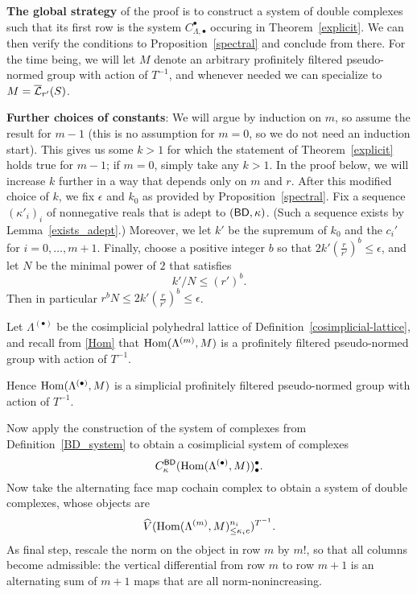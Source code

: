 \textbf{The global strategy}
of the proof is to construct a system of double complexes
such that its first row is the system $C_{\Lambda, \bullet}^\bullet$
occuring in Theorem~\ref{explicit}.
We can then verify the conditions to Proposition~\ref{spectral}
and conclude from there.
For the time being, we will let $M$ denote
an arbitrary profinitely filtered pseudo-normed group with action of $T^{-1}$,
and whenever needed we can specialize to $M = \overline{\mathcal L}_{r'}(S)$.

\textbf{Further choices of constants}:
We will argue by induction on $m$, so assume the result for $m-1$
(this is no assumption for $m=0$, so we do not need an induction start).
This gives us some $k>1$ for which the statement of Theorem~\ref{explicit} holds true for $m-1$;
if $m=0$, simply take any $k>1$.
In the proof below, we will increase $k$ further in a way that depends only on $m$ and $r$.
After this modified choice of $k$, we fix $\epsilon$ and $k_0$ as provided by Proposition~\ref{spectral}.
Fix a sequence $(\kappa'_i)_i$ of nonnegative reals that is adept to $(\mathsf{BD}, \kappa)$.
(Such a sequence exists by Lemma~\ref{exists_adept}.)
Moreover, we let $k'$ be the supremum of $k_0$ and the $c_i'$ for $i=0,\ldots,m+1$.
Finally, choose a positive integer $b$ so that $2k'(\tfrac r{r'})^b\leq \epsilon$,
and let $N$ be the minimal power of $2$ that satisfies
\[
  k'/N\leq (r')^b.
\]
Then in particular $r^bN\leq 2k'(\tfrac{r}{r'})^b\leq \epsilon$.

\begin{definition}
  \label{double_complex}
  \leanok
  Let $\Lambda^{(\bullet)}$ be the cosimplicial polyhedral lattice of
  Definition~\ref{cosimplicial-lattice},
  and recall from \ref{Hom} that $\operatorname{Hom}(\Lambda^{(m)}, M)$ is a
  profinitely filtered pseudo-normed group with action of $T^{-1}$.

  Hence $\operatorname{Hom}(\Lambda^{(\bullet)}, M)$ is a simplicial
  profinitely filtered pseudo-normed group with action of $T^{-1}$.

  Now apply the construction of the system of complexes from
  Definition~\ref{BD_system} to obtain a cosimplicial system of complexes
  \[
    C^{\mathsf{BD}}_{\kappa}(\operatorname{Hom}(\Lambda^{(\bullet)}, M))_\bullet^\bullet.
  \]
  Now take the alternating face map cochain complex
  to obtain a system of double complexes, whose objects are
  \[
    \widehat{V}(\operatorname{Hom}(\Lambda^{(m)},M)_{\leq \kappa_ic}^{n_i})^{T^{-1}}.
  \]
  As final step, rescale the norm on the object in row $m$ by $m!$,
  so that all columns become admissible:
  the vertical differential from row $m$ to row $m+1$
  is an alternating sum of $m+1$ maps that are all norm-nonincreasing.
\end{definition}

